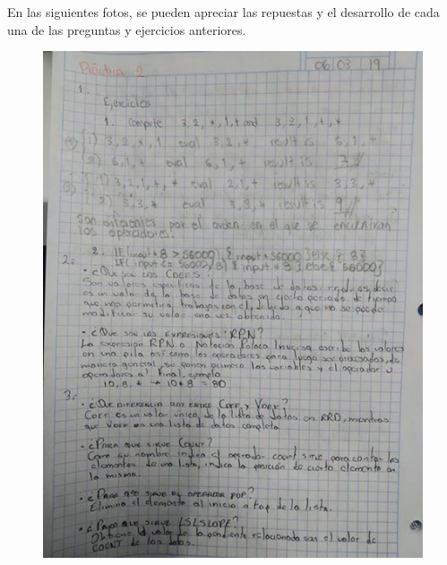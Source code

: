 En las siguientes fotos, se pueden apreciar las repuestas y el desarrollo de cada una de las preguntas y ejercicios anteriores.
\begin{figure}[H]
	\centering
	\includegraphics[scale=.85]{imagenes/practica/p2-1.jpg}
\end{figure}
